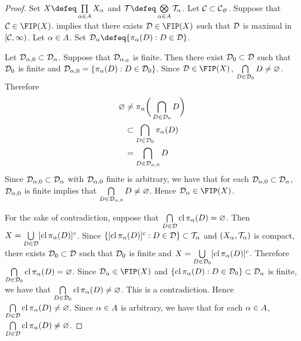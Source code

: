 \documentclass{book}
\begin{document}
	\begin{proof}
		Set $X \defeq \prod\limits_{\al \in A} X_{\al}$ and $\MT \defeq \bigotimes\limits_{\al \in A} \MT_{\al}$. Let $\mathcal{C} \subset \mathcal{C}_{\varnothing}$. Suppose that $\MC \in \FIP(X)$.  implies that there exists $\MD \in \FIP(X)$ such that $\mathcal{D}$ is maximal in $[\mathcal{C}, \infty)$. Let $\alpha \in A$. Set $\MD_{\al} \defeq \{\pi_{\al}(D):D \in \MD\}$. 
		
		Let $\mathcal{D}_{\alpha, 0} \subset \mathcal{D}_{\alpha}$. Suppose that $\mathcal{D}_{\alpha,_0}$ is finite. Then there exist $\mathcal{D}_0 \subset \mathcal{D}$ such that $\mathcal{D}_0$ is finite and $\mathcal{D}_{\alpha, 0} = \{\pi_{\alpha}(D): D \in \mathcal{D}_0\}$. Since $\MD \in \FIP(X)$, $\bigcap\limits_{D \in \mathcal{D}_0} D \neq \varnothing$. Therefore 
		\begin{align*}
			\varnothing
			& \neq \pi_{\alpha} \bigg( \bigcap_{D \in \mathcal{D}_0} D \bigg) \\
			& \subset \bigcap_{D \in \mathcal{D}_0} \pi_{\alpha}(D) \\
			& = \bigcap_{D \in \mathcal{D}_{\alpha, 0}} D 
		\end{align*}
		Since $\mathcal{D}_{\alpha, 0} \subset \mathcal{D}_{\alpha}$ with $\mathcal{D}_{\alpha, 0}$ finite is arbitrary, we have that for each $\mathcal{D}_{\alpha, 0} \subset \mathcal{D}_{\alpha}$, $\mathcal{D}_{\alpha,0}$ is finite implies that $\bigcap\limits_{D \in \mathcal{D}_{\alpha, 0}} D \neq \varnothing$. Hence $\MD_{\al} \in \FIP(X)$. 
		
		For the sake of contradiction, suppose that $\bigcap\limits_{D \in \mathcal{D}} \operatorname{cl} \pi_{\alpha}(D) = \varnothing$. Then $X = \bigcup\limits_{D \in \mathcal{D}} [ \operatorname{cl} \pi_{\alpha}(D) ]^c $. Since $\{[\operatorname{cl} \pi_{\alpha}(D)]^c:D \in \mathcal{D} \} \subset \mathcal{T}_{\alpha}$ and $(X_{\alpha}, \mathcal{T}_{\alpha})$ is compact, there exists $\mathcal{D}_0 \subset \mathcal{D}$ such that $\mathcal{D}_0$ is finite and $X = \bigcup\limits_{D \in \mathcal{D}_0} [ \operatorname{cl} \pi_{\alpha}(D) ]^c$. Therefore $\bigcap\limits_{D \in \mathcal{D}_0} \operatorname{cl} \pi_{\alpha}(D) = \varnothing$. Since $\MD_{\al} \in \FIP(X)$ and $\{ \operatorname{cl} \pi_{\alpha}(D): D \in \mathcal{D}_0 \} \subset \mathcal{D}_{\alpha}$ is finite, we have that $\bigcap\limits_{D \in \mathcal{D}_0} \operatorname{cl} \pi_{\alpha}(D) \neq \varnothing$. This is a contradiction. Hence $\bigcap\limits_{D \in \mathcal{D}} \operatorname{cl} \pi_{\alpha}(D) \neq \varnothing$. Since $\alpha \in A$ is arbitrary, we have that for each $\alpha \in A$, $\bigcap\limits_{D \in \mathcal{D}} \operatorname{cl} \pi_{\alpha}(D) \neq \varnothing$.
		

\end{proof}
\end{document}
